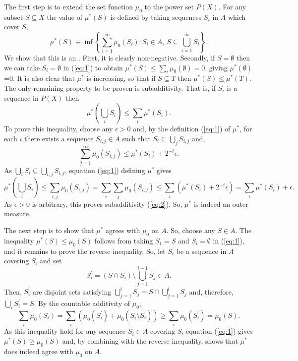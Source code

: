 \documentclass[12pt]{article}
\begin{document}

The first step is to extend the set function $\mu_0$ to the power set $P(X)$. For any subset $S\subseteq X$ the value of $\mu^*(S)$ is defined by taking sequences $S_i$ in $A$ which cover $S$,
\begin{equation}\label{eq:1}
\mu^*(S)\equiv\inf\left\{\sum_{i=1}^\infty \mu_0(S_i): S_i\in A,\ S\subseteq\bigcup_{i=1}^\infty S_i\right\}.
\end{equation}
We show that this is an . First, it is clearly non-negative. Secondly, if $S=\emptyset$ then we can take $S_i=\emptyset$ in (\ref{eq:1}) to obtain $\mu^*(S)\le\sum_i\mu_0(\emptyset)=0$, giving $\mu^*(\emptyset)$=0. It is also clear that $\mu^*$ is increasing, so that if $S\subseteq T$ then $\mu^*(S)\le\mu^*(T)$. The only remaining property to be proven is subadditivity. That is, if $S_i$ is a sequence in $P(X)$ then
\begin{equation}\label{eq:2}
\mu^*\left(\bigcup_i S_i\right)\le\sum_i\mu^*(S_i).
\end{equation}
To prove this inequality, choose any $\epsilon>0$ and, by the definition (\ref{eq:1}) of $\mu^*$, for each $i$ there exists a sequence $S_{i,j}\in A$ such that $S_i\subseteq\bigcup_j S_{i,j}$ and,
\begin{equation*}
\sum_{j=1}^\infty\mu_0(S_{i,j})\le\mu^*(S_i)+2^{-i}\epsilon.
\end{equation*}
As $\bigcup_iS_i\subseteq\bigcup_{i,j}S_{i,j}$, equation (\ref{eq:1}) defining $\mu^*$ gives
\begin{equation*}
\mu^*\left(\bigcup_iS_i\right)\le\sum_{i,j}\mu_0(S_{i,j})=\sum_i\sum_j\mu_0(S_{i,j})\le\sum_i(\mu^*(S_i)+2^{-i}\epsilon)=\sum_i\mu^*(S_i)+\epsilon.
\end{equation*}
As $\epsilon>0$ is arbitrary, this proves subadditivity (\ref{eq:2}). So, $\mu^*$ is indeed an outer measure.

The next step is to show that $\mu^*$ agrees with $\mu_0$ on $A$. So, choose any $S\in A$. The inequality $\mu^*(S)\le\mu_0(S)$ follows from taking $S_1=S$ and $S_i=\emptyset$ in (\ref{eq:1}), and it remains to prove the reverse inequality. So, let $S_i$ be a sequence in $A$ covering $S$, and set
\begin{equation*}
S^\prime_i=(S\cap S_i)\setminus\bigcup_{j=1}^{i-1}S_j\in A.
\end{equation*}
Then, $S^\prime_i$ are disjoint sets satisfying $\bigcup_{j=1}^iS^\prime_j=S\cap \bigcup_{j=1}^iS_j$ and, therefore, $\bigcup_iS^\prime_i=S$. By the countable additivity of $\mu_0$,
\begin{equation*}
\sum_i\mu_0(S_i)=\sum_i(\mu_0(S^\prime_i)+\mu_0(S_i\setminus S^\prime_i))\ge\sum_i\mu_0(S^\prime_i)=\mu_0(S).
\end{equation*}
As this inequality hold for any sequence $S_i\in A$ covering $S$, equation (\ref{eq:1}) gives $\mu^*(S)\ge\mu_0(S)$ and, by combining with the reverse inequality, shows that $\mu^*$ does indeed agree with $\mu_0$ on $A$.
\end{document}

